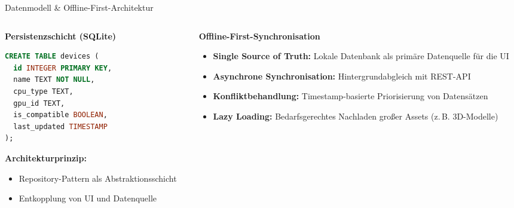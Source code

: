 \documentclass[10pt]{beamer}
\begin{document}
\begin{frame}[fragile]{Datenmodell \& Offline-First-Architektur}
    \begin{columns}[T]
        \begin{column}{0.45\textwidth}
            \textbf{Persistenzschicht (SQLite)}
            
            \begin{lstlisting}[language=SQL, basicstyle=\tiny, frame=single, keywordstyle=\color{blue}]
CREATE TABLE devices (
  id INTEGER PRIMARY KEY,
  name TEXT NOT NULL,
  cpu_type TEXT,
  gpu_id TEXT,
  is_compatible BOOLEAN,
  last_updated TIMESTAMP
);
            \end{lstlisting}
            
            \vspace{0.2cm}
            
            \textbf{Architekturprinzip:}
            \begin{itemize}
                \item \footnotesize Repository-Pattern als Abstraktionsschicht
                \item \footnotesize Entkopplung von UI und Datenquelle
            \end{itemize}
        \end{column}
        
        \begin{column}{0.5\textwidth}
            \textbf{Offline-First-Synchronisation}
            \begin{itemize}
                \item \textbf{Single Source of Truth:}
                Lokale Datenbank als primäre Datenquelle für die UI
                
                \item \textbf{Asynchrone Synchronisation:}
                Hintergrundabgleich mit REST-API
                
                \item \textbf{Konfliktbehandlung:}
                Timestamp-basierte Priorisierung von Datensätzen
                
                \item \textbf{Lazy Loading:}
                Bedarfsgerechtes Nachladen großer Assets (z.\,B. 3D-Modelle)
            \end{itemize}
        \end{column}
    \end{columns}
\end{frame}
\end{document}
